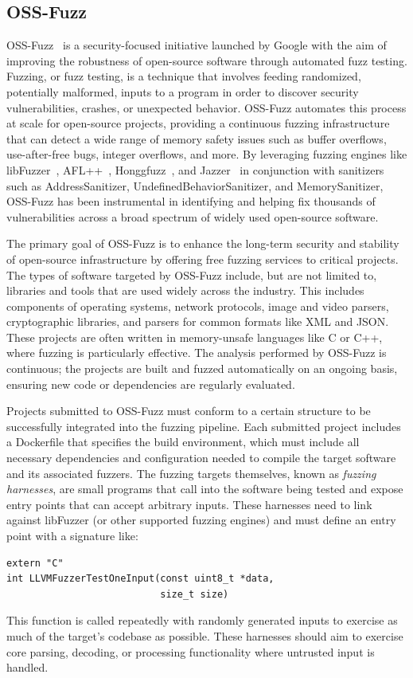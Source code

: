 \subsection{OSS-Fuzz}
\label{sec:oss-fuzz}
OSS-Fuzz~\cite{oss-fuzz} is a security-focused initiative launched by Google with the aim of improving the robustness of open-source software through automated fuzz testing. 
Fuzzing, or fuzz testing, is a technique that involves feeding randomized, potentially malformed, inputs to a program in order to discover security vulnerabilities, crashes, or unexpected behavior. 
OSS-Fuzz automates this process at scale for open-source projects, providing a continuous fuzzing infrastructure that can detect a wide range of memory safety issues such as buffer overflows, use-after-free bugs, integer overflows, and more. 
By leveraging fuzzing engines like libFuzzer~\cite{libfuzzer}, AFL++~\cite{aflplusplus}, Honggfuzz~\cite{honggfuzz}, and Jazzer~\cite{jazzer} in conjunction with sanitizers such as AddressSanitizer, UndefinedBehaviorSanitizer, and MemorySanitizer, OSS-Fuzz has been instrumental in identifying and helping fix thousands of vulnerabilities across a broad spectrum of widely used open-source software.

The primary goal of OSS-Fuzz is to enhance the long-term security and stability of open-source infrastructure by offering free fuzzing services to critical projects. 
The types of software targeted by OSS-Fuzz include, but are not limited to, libraries and tools that are used widely across the industry. 
This includes components of operating systems, network protocols, image and video parsers, cryptographic libraries, and parsers for common formats like XML and JSON. 
These projects are often written in memory-unsafe languages like C or C++, where fuzzing is particularly effective. 
The analysis performed by OSS-Fuzz is continuous; the projects are built and fuzzed automatically on an ongoing basis, ensuring new code or dependencies are regularly evaluated.

Projects submitted to OSS-Fuzz must conform to a certain structure to be successfully integrated into the fuzzing pipeline. 
Each submitted project includes a Dockerfile that specifies the build environment, which must include all necessary dependencies and configuration needed to compile the target software and its associated fuzzers. 
The fuzzing targets themselves, known as \emph{fuzzing harnesses}, are small programs that call into the software being tested and expose entry points that can accept arbitrary inputs. 
These harnesses need to link against libFuzzer (or other supported fuzzing engines) and must define an entry point with a signature like:
\begin{verbatim}
extern "C" 
int LLVMFuzzerTestOneInput(const uint8_t *data, 
                           size_t size)
\end{verbatim}
This function is called repeatedly with randomly generated inputs to exercise as much of the target’s codebase as possible.
These harnesses should aim to exercise core parsing, decoding, or processing functionality where untrusted input is handled. 

